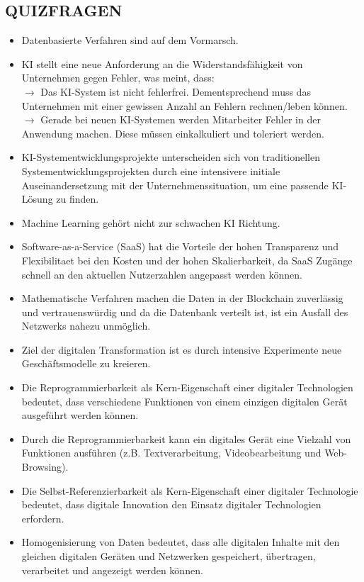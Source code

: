 \documentclass[12pt,a4paper]{article}
\begin{document}
\vspace{0.5cm}
\subsection{QUIZFRAGEN} %
\begin{itemize}
   \item Datenbasierte Verfahren sind auf dem Vormarsch.
   \item KI stellt eine neue Anforderung an die Widerstandsfähigkeit von Unternehmen gegen Fehler, was meint, dass:\\
         $\rightarrow$ Das KI-System ist nicht fehlerfrei. Dementsprechend muss das Unternehmen mit einer gewissen Anzahl an Fehlern rechnen/leben können.\\
         $\rightarrow$ Gerade bei neuen KI-Systemen werden Mitarbeiter Fehler in der Anwendung machen. Diese müssen einkalkuliert und toleriert werden.
   \item KI-Systementwicklungsprojekte unterscheiden sich von traditionellen Systementwicklungsprojekten durch eine intensivere initiale Auseinandersetzung mit der Unternehmenssituation, um eine passende KI-Lösung zu finden.
   \item Machine Learning gehört nicht zur schwachen KI Richtung.
   
   \item Software-as-a-Service (SaaS) hat die Vorteile der hohen Transparenz und Flexibilitaet bei den Kosten und der hohen Skalierbarkeit, da SaaS Zugänge schnell an den aktuellen Nutzerzahlen angepasst werden können.
   
   \item Mathematische Verfahren machen die Daten in der Blockchain zuverlässig und vertrauenswürdig und da die Datenbank verteilt ist, ist ein Ausfall des Netzwerks nahezu unmöglich.
   
   \item Ziel der digitalen Transformation ist es durch intensive Experimente neue Ge\-schäfts\-mo\-del\-le zu kreieren.
   
   \item Die Reprogrammierbarkeit als Kern-Eigenschaft einer digitaler Technologien bedeutet, dass verschiedene Funktionen von einem einzigen digitalen Gerät ausgeführt werden können.
   \item Durch die Reprogrammierbarkeit kann ein digitales Gerät eine Vielzahl von Funktionen ausführen (z.B. Textverarbeitung, Videobearbeitung und Web-Browsing).
   \item Die Selbst-Referenzierbarkeit als Kern-Eigenschaft einer digitaler Technologie bedeutet, dass digitale Innovation den Einsatz digitaler Technologien erfordern.
   \item Homogenisierung von Daten bedeutet, dass alle digitalen Inhalte mit den gleichen digitalen Geräten und Netzwerken gespeichert, übertragen, verarbeitet und angezeigt werden können.
   

\end{itemize}
\end{document}
